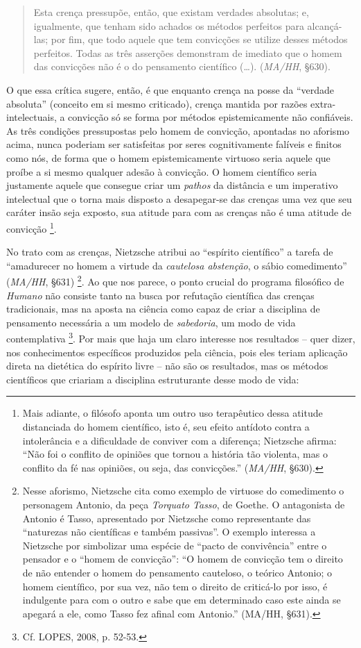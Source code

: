 \documentclass[
	12pt,				%
	openright,			%
	oneside,			%
	a4paper,			%
	english,			%
	french,				%
	spanish,			%
	brazil				%
	]{abntex2}
\begin{document}
\begin{quotation}
Esta crença pressupõe, então, que existam verdades absolutas; e, igualmente, que tenham sido achados os métodos perfeitos para alcançá-las; por fim, que todo aquele que tem convicções se utilize desses métodos perfeitos. Todas as três asserções demonstram de imediato que o homem das convicções não é o do pensamento científico (…). (\textit{MA/HH}, §630).
\end{quotation}

O que essa crítica sugere, então, é que enquanto crença na posse da “verdade absoluta” (conceito em si mesmo criticado), crença mantida por razões extra-intelectuais, a convicção só se forma por métodos epistemicamente não confiáveis. As três condições pressupostas pelo homem de convicção, apontadas no aforismo acima, nunca poderiam ser satisfeitas por seres cognitivamente falíveis e finitos como nós, de forma que o homem epistemicamente virtuoso seria aquele que  proíbe a si mesmo qualquer adesão à convicção. O homem científico seria justamente aquele que consegue criar um \textit{pathos} da distância e um imperativo intelectual que o torna mais disposto a desapegar-se das crenças uma vez que seu caráter insão seja exposto, sua atitude para com as crenças não é uma atitude de convicção
\footnote{Mais adiante, o filósofo aponta um outro uso terapêutico dessa atitude distanciada do homem científico, isto é, seu efeito antídoto contra a intolerância e a dificuldade de conviver com a diferença; Nietzsche afirma: “Não foi o conflito de opiniões que tornou a história tão violenta, mas o conflito da fé nas opiniões, ou seja, das convicções.” (\textit{MA/HH}, §630).}. 

	No trato com as crenças, Nietzsche atribui ao “espírito científico” a tarefa de “amadurecer no homem a virtude da \textit{cautelosa abstenção}, o sábio comedimento” (\textit{MA/HH}, §631)
\footnote{Nesse aforismo, Nietzsche cita como exemplo de virtuose do comedimento o personagem Antonio, da peça \textit{Torquato Tasso}, de Goethe. O antagonista de Antonio é Tasso, apresentado por Nietzsche como representante das “naturezas não científicas e também passivas”. O exemplo interessa a Nietzsche por simbolizar uma espécie de “pacto de convivência” entre o pensador e o “homem de convicção”: “O homem de convicção tem o direito de não entender o homem do pensamento cauteloso, o teórico Antonio; o homem científico, por sua vez, não tem o direito de criticá-lo por isso, é indulgente para com o outro e sabe que em determinado caso este ainda se apegará a ele, como Tasso fez afinal com Antonio.” (MA/HH, §631).}. 
Ao que nos parece, o ponto crucial do programa filosófico de \textit{Humano} não consiste tanto na busca por refutação científica das crenças tradicionais, mas na aposta na ciência como capaz de criar a disciplina de pensamento necessária a um modelo de \textit{sabedoria}, um modo de vida contemplativa
\footnote{Cf. LOPES, 2008, p. 52-53.}. 
Por mais que haja um claro interesse nos resultados – quer dizer, nos conhecimentos específicos produzidos pela ciência, pois eles teriam aplicação direta na dietética do espírito livre – não são os resultados, mas os métodos científicos que criariam a disciplina estruturante desse modo de vida:
\end{document}
